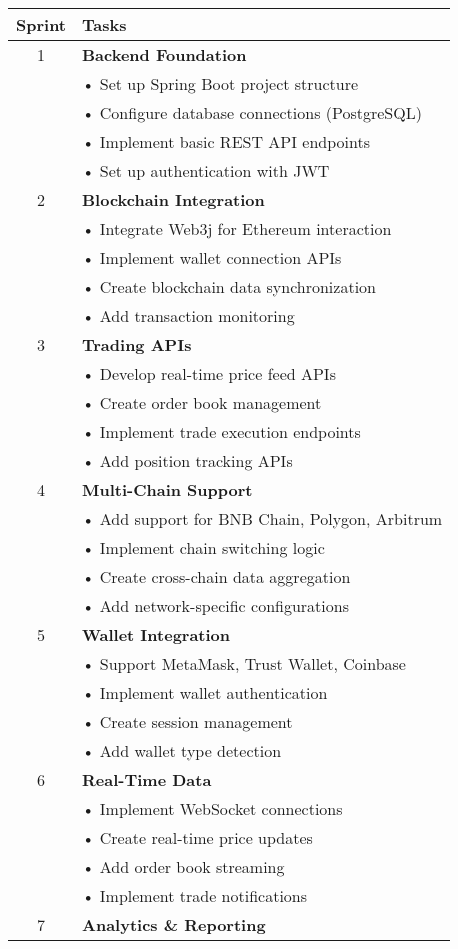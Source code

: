 \documentclass{article}
\begin{document}
\begin{longtable}{|c|p{}|}
\hline
\textbf{Sprint} & \textbf{Tasks} \\
\hline
1 & \textbf{Backend Foundation}\\
& • Set up Spring Boot project structure\\
& • Configure database connections (PostgreSQL)\\
& • Implement basic REST API endpoints\\
& • Set up authentication with JWT\\
\hline
2 & \textbf{Blockchain Integration}\\
& • Integrate Web3j for Ethereum interaction\\
& • Implement wallet connection APIs\\
& • Create blockchain data synchronization\\
& • Add transaction monitoring\\
\hline
3 & \textbf{Trading APIs}\\
& • Develop real-time price feed APIs\\
& • Create order book management\\
& • Implement trade execution endpoints\\
& • Add position tracking APIs\\
\hline
4 & \textbf{Multi-Chain Support}\\
& • Add support for BNB Chain, Polygon, Arbitrum\\
& • Implement chain switching logic\\
& • Create cross-chain data aggregation\\
& • Add network-specific configurations\\
\hline
5 & \textbf{Wallet Integration}\\
& • Support MetaMask, Trust Wallet, Coinbase\\
& • Implement wallet authentication\\
& • Create session management\\
& • Add wallet type detection\\
\hline
6 & \textbf{Real-Time Data}\\
& • Implement WebSocket connections\\
& • Create real-time price updates\\
& • Add order book streaming\\
& • Implement trade notifications\\
\hline
7 & \textbf{Analytics \& Reporting}\\

\end{longtable}
\end{document}
